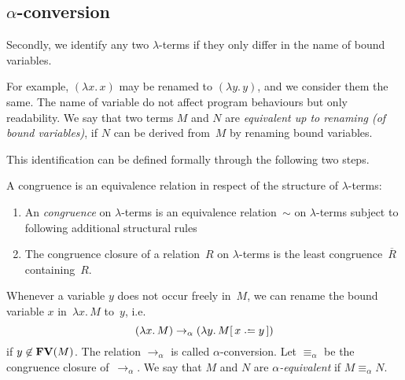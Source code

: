 \subsection{$\alpha$-conversion}
Secondly, we identify any two $\lambda$-terms if they only differ in the name of
bound variables.

For example, $(\lambda x.\, x)$ may be renamed to $(\lambda y.\, y)$, and we
consider them the same. The name of variable do not affect program behaviours
but only readability. We say that two terms $M$ and $N$ are \emph{equivalent up
  to renaming (of bound variables)}, if $N$ can be derived from~$M$ by renaming
bound variables.

This identification can be defined formally through the following two steps.
\begin{definition}[Congruence]
  A congruence is an equivalence relation in respect of the structure of
  $\lambda$-terms:
  \begin{enumerate}
    \item An \emph{congruence} on $\lambda$-terms is an equivalence
      relation~$\sim$ on $\lambda$-terms subject to following additional
      structural rules
      \begin{multicols}{2}
        \begin{prooftree}
        \end{prooftree}
        \begin{prooftree}
        \end{prooftree}
      \end{multicols}
    \item The congruence closure of a relation~$R$ on $\lambda$-terms is the
      least congruence~$\overline{R}$ containing~$R$. 
  \end{enumerate}
\end{definition}

\begin{definition}
  Whenever a variable $y$ does not occur freely in~$M$, we can rename the bound
  variable $x$ in~$\lambda x.\, M$ to~$y$, i.e.\ 
  \[
    (\lambda x.\, M) \to_\alpha (\lambda y.\, M\subst{x}{y})
  \]
  if $y \not\in \FV(M)$. The relation
  $\to_\alpha$ is called $\alpha$-conversion. Let $\equiv_\alpha$ be the
  congruence closure of~$\to_\alpha$. We say that $M$ and $N$ are
  \emph{$\alpha$-equivalent} if $M \equiv_\alpha N$.
\end{definition}

